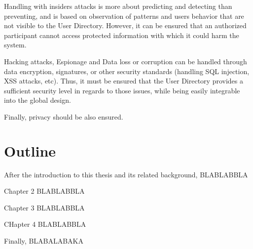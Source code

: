 Handling with insiders attacks is more about predicting and detecting than preventing, and is based on observation of patterns and users behavior that are not visible to the User Directory\cite{Schultz2002}. However, it can be ensured that an authorized participant cannot access protected information with which it could harm the system.

Hacking attacks, Espionage and Data loss or corruption can be handled through data encryption, signatures, or other security standards (handling SQL injection, XSS attacks, etc). Thus, it must be ensured that the User Directory provides a sufficient security level in regards to those issues, while being easily integrable into the global design. 

Finally, privacy should be also ensured.


\section{Outline}
After the introduction to this thesis and its related background, BLABLABBLA

Chapter 2 BLABLABBLA

Chapter 3 BLABLABBLA

CHapter 4 BLABLABBLA

Finally, BLABALABAKA



